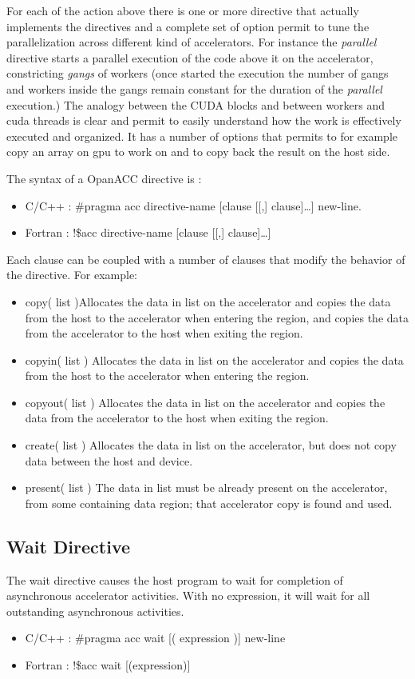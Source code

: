 For each of the action above there is one or more directive that actually
implements the directives and a complete set of option permit to tune the
parallelization across different kind of accelerators.
For instance the \emph{parallel} directive starts a parallel execution of the
code above it on the accelerator, constricting \emph{gangs} of workers (once
started the execution the number of gangs and workers inside the gangs remain
constant for the duration of the \emph{parallel} execution.) The analogy between
the CUDA blocks  and between workers and cuda threads is clear and permit to
easily understand how the work is effectively executed and organized.
It has a number of options that permits to  for example copy an array on gpu to
work on and to copy back the result on the host side.



The syntax of a OpanACC directive is :
\begin{itemize}
  \item C/C++   : \#pragma acc directive-name [clause [[,] clause]…] new-line.
  \item Fortran : !\$acc directive-name [clause [[,] clause]…]
\end{itemize}

Each clause can be coupled with a number of clauses that modify the behavior of
the directive. For example:
\begin{itemize}
  \item copy( list )Allocates the data in list on the accelerator and copies the data 
from the host to the accelerator when entering the region, and 
copies the data from the accelerator to the host when exiting 
the region.
\item copyin( list )
Allocates the data in list on the accelerator and copies the data 
from the host to the accelerator when entering the region.
\item copyout( list )
Allocates the data in list on the accelerator and copies the data 
from the accelerator to the host when exiting the region.
\item create( list )
Allocates the data in list on the accelerator, but does not copy 
data between the host and device.
\item present( list )
The data in list must be already present on the accelerator, from 
some containing data region; that accelerator copy is found 
and used.\end{itemize}


\subsection{Wait Directive}
The wait directive causes the host program to wait for completion of asynchronous accelerator activities. With no expression, it 
will wait for all outstanding asynchronous activities.
\begin{itemize}
  \item C/C++   : \#pragma acc wait [( expression )] new-line
  \item Fortran : !\$acc wait [(expression)]
\end{itemize}

